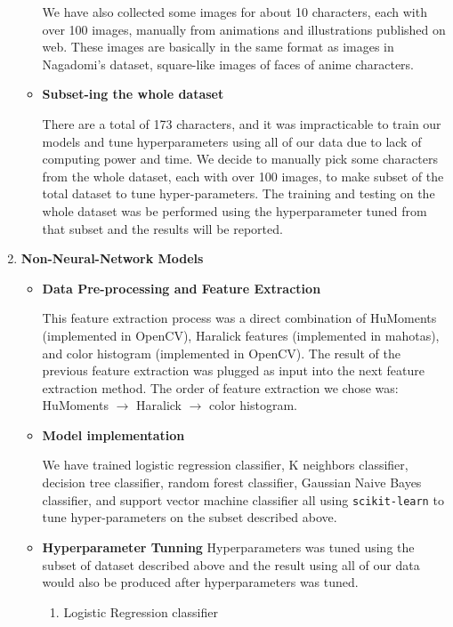 \documentclass[11.5pt]{article}
\begin{document}
\begin{enumerate}
\begin{itemize}
            We have also collected some images for about 10 characters, each with over 100 images, manually from animations and illustrations published on web.
            These images are basically in the same format as images in Nagadomi's dataset, square-like images of faces of anime characters.
            \item \textbf{Subset-ing the whole dataset}

            There are a total of 173 characters, and it was impracticable to train our models and tune hyperparameters using all of our data due to lack of computing power and time.
            We decide to manually pick some characters from the whole dataset, each with over 100 images, to make subset of the total dataset to tune hyper-parameters.
            The training and testing on the whole dataset was be performed using the hyperparameter tuned from that subset and the results will be reported.
        \end{itemize}
        \item \textbf{Non-Neural-Network Models}
        \begin{itemize}
            \item \textbf{Data Pre-processing and Feature Extraction}

            This feature extraction process was a direct combination of HuMoments (implemented in OpenCV), Haralick features (implemented in mahotas), and color histogram (implemented in OpenCV).
            The result of the previous feature extraction was plugged as input into the next feature extraction method.
            The order of feature extraction we chose was: HuMoments $\rightarrow$ Haralick $\rightarrow$ color histogram.
            \item \textbf{Model implementation}

            We have trained logistic regression classifier, K neighbors classifier, decision tree classifier, random forest classifier, Gaussian Naive Bayes classifier, and support vector machine classifier all using \texttt{scikit-learn} to tune hyper-parameters on the subset described above.
            \item \textbf{Hyperparameter Tunning}
            Hyperparameters was tuned using the subset of dataset described above and the result using all of our data would also be produced after hyperparameters was tuned.
            \begin{enumerate}
                \item Logistic Regression classifier


\end{enumerate}
\end{itemize}
\end{enumerate}
\end{document}
